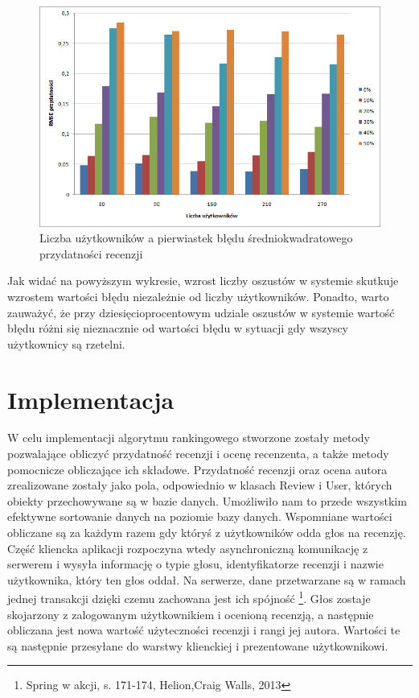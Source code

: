 \begin{figure}[h]
	\centering
	\includegraphics[scale=0.7]{images/LiarsTest.png}
	\caption{Liczba użytkowników a pierwiastek błędu średniokwadratowego przydatności recenzji}
\end{figure}

Jak widać na powyższym wykresie, wzrost liczby oszustów w systemie skutkuje wzrostem wartości błędu niezależnie od liczby użytkowników. Ponadto, warto zauważyć, że przy dziesięcioprocentowym udziale oszustów w systemie wartość błędu różni się nieznacznie od wartości błędu w sytuacji gdy wszyscy użytkownicy są rzetelni.

\section{Implementacja}

W celu implementacji algorytmu rankingowego stworzone zostały metody pozwalające obliczyć przydatność recenzji i ocenę recenzenta, a także metody pomocnicze obliczające ich składowe. Przydatność recenzji oraz ocena autora zrealizowane zostały jako pola, odpowiednio w klasach Review i User, których obiekty przechowywane są w bazie danych. Umożliwiło nam to przede wszystkim efektywne sortowanie danych na poziomie bazy danych. Wspomniane wartości obliczane są za każdym razem gdy któryś z użytkowników odda głos na recenzję. Część kliencka aplikacji rozpoczyna wtedy asynchroniczną komunikację z serwerem i wysyła informację o typie głosu, identyfikatorze recenzji i nazwie użytkownika, który ten  głos oddał. Na serwerze, dane przetwarzane są w ramach jednej transakcji dzięki czemu zachowana jest ich spójność \footnote{Spring w akcji, s. 171-174, Helion,Craig Walls, 2013}. Głos zostaje skojarzony z zalogowanym użytkownikiem i ocenioną recenzją, a następnie obliczana jest nowa wartość użyteczności recenzji i rangi jej autora. Wartości te są następnie przesyłane do warstwy klienckiej i  prezentowane użytkownikowi.

